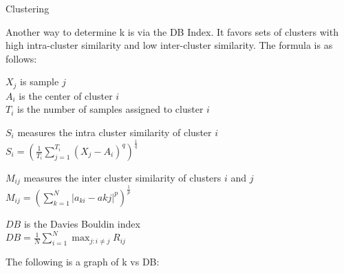 \documentclass[final,t]{beamer}
\begin{document}
\begin{frame}{}
\begin{columns}[t]
\begin{column}{.3\linewidth}
\begin{block}{Clustering}
       \par Another way to
       determine k is via the DB Index.  It favors sets of clusters
       with high intra-cluster similarity and low inter-cluster
       similarity.  The formula is as follows:\newline

$X_j$ is sample $j$\\
$A_i$ is the center of cluster $i$\\
$T_i$ is the number of samples assigned to cluster $i$\newline

$S_i$ measures the intra cluster similarity of cluster $i$\\
$S_i = (\frac{1}{T_i} \sum\limits_{j=1}^{T_i} (X_j -
A_i)^q)^{\frac{1}{q}}$\newline

$M_{ij}$ measures the inter cluster similarity of clusters $i$ and $j$\\
$M_{ij} = (\sum\limits_{k=1}^{N} |a_{ki} - a{kj}|^p)^{\frac{1}{p}}$\newline

$DB$ is the Davies Bouldin index\\
$DB = \frac{1}{N} \sum\limits_{i=1}^N \max_{j:i \neq j} R_{ij}$\newline

The following is a graph of k vs DB:\newline


\end{block}
\end{column}
\end{columns}
\end{frame}
\end{document}

